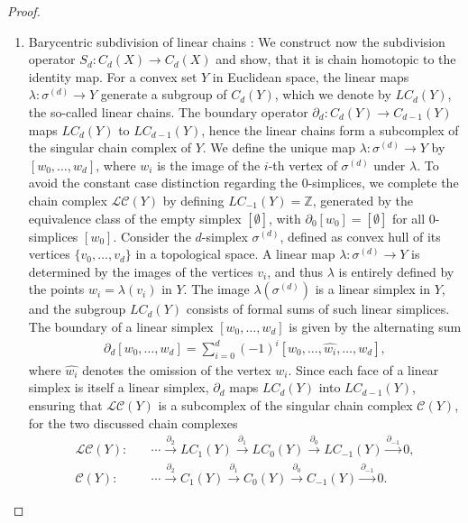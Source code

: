 \begin{proof}{\textit{\cite[Proof of Proposition 2.21]{hatcher2005algebraic}}}
\begin{enumerate}
	\item Barycentric subdivision of linear chains \cite[Proposition 2.21 (2)]{hatcher2005algebraic}: We construct now the subdivision operator $S_d: C_d(X) \rightarrow C_d(X)$ and show, that it is chain homotopic to the identity map. For a convex set \(Y\) in Euclidean space, the linear maps \(\lambda: \sigma^{(d)} \rightarrow Y\) generate a subgroup of \(C_d(Y)\), which we denote by \(LC_d(Y)\), the so-called linear chains. The boundary operator \(\partial_d: C_d(Y) \rightarrow C_{d-1}(Y)\) maps \(LC_d(Y)\) to \(LC_{d-1}(Y)\), hence the linear chains form a subcomplex of the singular chain complex of \(Y\). We define the unique map \(\lambda: \sigma^{(d)} \rightarrow Y\) by \([w_0, \ldots, w_d]\), where \(w_i\) is the image of the \(i\)-th vertex of \(\sigma^{(d)}\) under \(\lambda\). To avoid the constant case distinction regarding the \(0\)-simplices, we complete the chain complex \(\mathcal{LC}(Y)\) by defining \(LC_{-1}(Y) = \mathbb{Z}\), generated by the equivalence class of the empty simplex \([\emptyset]\), with \(\partial_0[w_0] = [\emptyset]\) for all \(0\)-simplices \([w_0]\). Consider the \(d\)-simplex \(\sigma^{(d)}\), defined as convex hull of its vertices \(\{v_0, \ldots, v_d\}\) in a topological space. A linear map \(\lambda: \sigma^{(d)} \rightarrow Y\) is determined by the images of the vertices \(v_i\), and thus \(\lambda\) is entirely defined by the points \(w_i = \lambda(v_i)\) in \(Y\). The image \(\lambda(\sigma^{(d)})\) is a linear simplex in \(Y\), and the subgroup \(LC_d(Y)\) consists of formal sums of such linear simplices. The boundary of a linear simplex \([w_0, \ldots, w_d]\) is given by the alternating sum
	\begin{align}
		\partial_d[w_0, \ldots, w_d] = \sum_{i=0}^d (-1)^i [w_0, \ldots, \hat{w_i}, \ldots, w_d], 
	\end{align}
	where \(\hat{w_i}\) denotes the omission of the vertex \(w_i\). Since each face of a linear simplex is itself a linear simplex, \(\partial_d\) maps \(LC_d(Y)\) into \(LC_{d-1}(Y)\), ensuring that \(\mathcal{LC}(Y)\) is a subcomplex of the singular chain complex \(\mathcal{C}(Y)\), for the two discussed chain complexes
	\begin{align}
		\mathcal{LC}(Y): &\quad \cdots \xrightarrow{\partial_{2}} LC_{1}(Y) \xrightarrow{\partial_{1}} LC_0(Y) \xrightarrow{\partial_{0}} LC_{-1}(Y) \xrightarrow{\partial_{-1}} 0, \\
		\mathcal{C}(Y): &\quad \cdots \xrightarrow{\partial_{2}} C_{1}(Y) \xrightarrow{\partial_{1}} C_0(Y) \xrightarrow{\partial_{0}} C_{-1}(Y) \xrightarrow{\partial_{-1}} 0.

\end{align}
\end{enumerate}
\end{proof}
